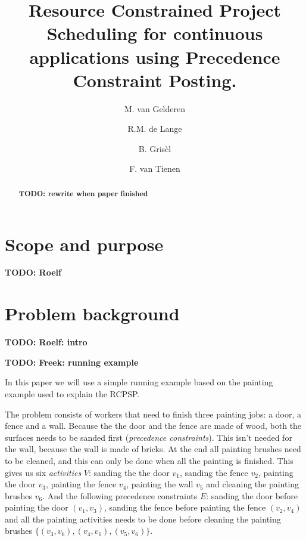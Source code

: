 \documentclass{article}
\title{Resource Constrained Project Scheduling for continuous applications using Precedence Constraint Posting.}
\author{M. van Gelderen  \and
    R.M. de Lange \and
    B. Gris\`el \and
    F. van Tienen}
\date{}
\newcommand{\TODO}[1]{{\color{red}\textbf{TODO: #1}}}
\begin{document}
\maketitle
\thispagestyle{empty}

\begin{abstract}
\TODO{rewrite when paper finished}
\end{abstract}


\newpage


\section{Scope and purpose}

\TODO{Roelf}


\newpage


\section{Problem background}

\TODO{Roelf: intro}

\TODO{Freek: running example}

In this paper we will use a simple running example based on the painting example used to explain the RCPSP.

The problem consists of workers that need to finish three painting jobs: a door, a fence and a wall.
Because the the door and the fence are made of wood, both the surfaces needs to be sanded first (\emph{precedence constraints}).
This isn't needed for the wall, because the wall is made of bricks.
At the end all painting brushes need to be cleaned, and this can only be done when all the painting is finished.
This gives us six \emph{activities} $V$: sanding the the door $v_1$, sanding the fence $v_2$,  painting the door $v_3$, painting the fence $v_4$, painting the wall $v_5$ and cleaning the painting brushes $v_6$.
And the following precedence constraints $E$: sanding the door before painting the door $(v_1, v_3)$, sanding the fence before painting the fence $(v_2, v_4)$ and all the painting activities needs to be done before cleaning the painting brushes $\{(v_3, v_6), (v_4, v_6), (v_5, v_6)\}$.
\end{document}
